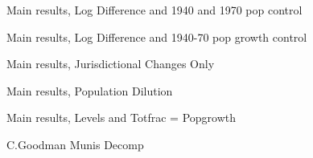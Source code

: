 \documentclass{article}
\begin{document}
\clearpage
\begin{table}
\footnotesize
\centering
\caption{Main results, Log Difference and 1940 and 1970 pop control}
\begin{threeparttable}
\footnotesize

\end{threeparttable}
\label{tab:log_effect}
\end{table}
\clearpage



\clearpage
\begin{table}
\footnotesize
\centering
\caption{Main results, Log Difference and 1940-70 pop growth control}
\begin{threeparttable}
\footnotesize

\end{threeparttable}
\label{tab:log_effect}
\end{table}
\clearpage


\begin{table}
\footnotesize
\centering
\caption{Main results, Jurisdictional Changes Only}
\begin{threeparttable}
\footnotesize

\end{threeparttable}
\label{tab:pct_effect}
\end{table}
\clearpage

\begin{table}
\footnotesize
\centering
\caption{Main results, Population Dilution}
\begin{threeparttable}
\footnotesize

\end{threeparttable}
\label{tab:dilute_effect}
\end{table}
\clearpage



\begin{table}
\footnotesize
\centering
\caption{Main results, Levels and Totfrac = Popgrowth}
\begin{threeparttable}
\footnotesize

\end{threeparttable}
\label{tab:dilute_effect}
\end{table}
\clearpage


\clearpage
\begin{table}
\footnotesize
\centering
\caption{C.Goodman Munis Decomp}
\begin{threeparttable}
\footnotesize

\end{threeparttable}
\label{tab:decomp_cgoodman}
\end{table}
\clearpage
\end{document}
